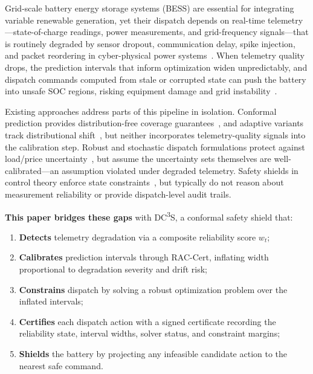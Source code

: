 \documentclass[11pt,a4paper,twocolumn]{article}
\begin{document}
Grid-scale battery energy storage systems (BESS) are essential for integrating variable renewable generation, yet their dispatch depends on real-time telemetry---state-of-charge readings, power measurements, and grid-frequency signals---that is routinely degraded by sensor dropout, communication delay, spike injection, and packet reordering in cyber-physical power systems~\cite{dibaji2019systems,chandola2009anomaly}. When telemetry quality drops, the prediction intervals that inform optimization widen unpredictably, and dispatch commands computed from stale or corrupted state can push the battery into unsafe SOC regions, risking equipment damage and grid instability~\cite{chen2020review_bess}.

Existing approaches address parts of this pipeline in isolation.  Conformal prediction provides distribution-free coverage guarantees~\cite{vovk2005conformal,shafer2008tutorial}, and adaptive variants track distributional shift~\cite{gibbs2021adaptive,zaffran2022adaptive}, but neither incorporates telemetry-quality signals into the calibration step.  Robust and stochastic dispatch formulations protect against load/price uncertainty~\cite{bertsimas2011theory,birge2011stochastic}, but assume the uncertainty sets themselves are well-calibrated---an assumption violated under degraded telemetry.  Safety shields in control theory enforce state constraints~\cite{alshiekh2018safe,bastani2021safe}, but typically do not reason about measurement reliability or provide dispatch-level audit trails.

\textbf{This paper bridges these gaps} with DC\textsuperscript{3}S, a conformal safety shield that:
\begin{enumerate}[leftmargin=*,topsep=2pt,itemsep=1pt]
  \item \textbf{Detects} telemetry degradation via a composite reliability score $w_t$;
  \item \textbf{Calibrates} prediction intervals through RAC-Cert, inflating width proportional to degradation severity and drift risk;
  \item \textbf{Constrains} dispatch by solving a robust optimization problem over the inflated intervals;
  \item \textbf{Certifies} each dispatch action with a signed certificate recording the reliability state, interval widths, solver status, and constraint margins;
  \item \textbf{Shields} the battery by projecting any infeasible candidate action to the nearest safe command.
\end{enumerate}
\end{document}
